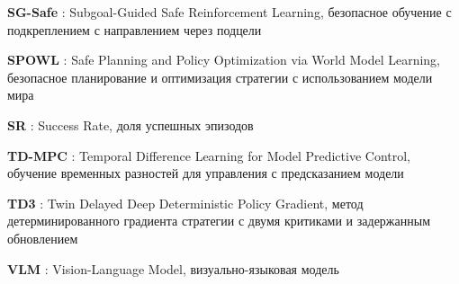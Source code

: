 \textbf{SG-Safe} : Subgoal-Guided Safe Reinforcement Learning, безопасное обучение с подкреплением с направлением через подцели

\textbf{SPOWL} : Safe Planning and Policy Optimization via World Model Learning, безопасное планирование и оптимизация стратегии с использованием модели мира

\textbf{SR} : Success Rate, доля успешных эпизодов

\textbf{TD-MPC} : Temporal Difference Learning for Model Predictive Control, обучение временных разностей для управления с предсказанием модели

\textbf{TD3} : Twin Delayed Deep Deterministic Policy Gradient, метод детерминированного градиента стратегии с двумя критиками и задержанным обновлением

\textbf{VLM} : Vision-Language Model, визуально-языковая модель
